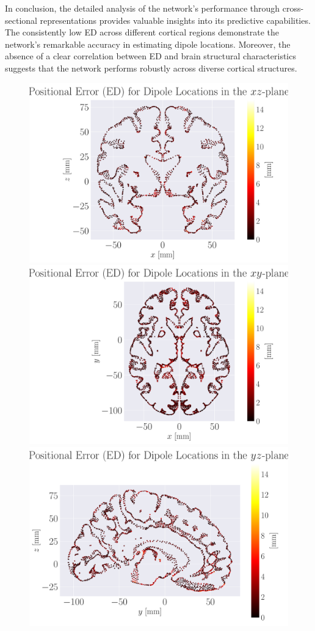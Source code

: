 \documentclass[a4paper, UKenglish, 11pt]{uiomaster}
\begin{document}
In conclusion, the detailed analysis of the network's performance through cross-sectional representations provides valuable insights into its predictive capabilities. The consistently low ED across different cortical regions demonstrate the network's remarkable accuracy in estimating dipole locations. Moreover, the absence of a clear correlation between ED and brain structural characteristics suggests that the network performs robustly across diverse cortical structures.


\begin{figure}[ht]
    \centering
    \includegraphics[width=0.7\linewidth]{figures/Simple/MED_simple_dipole_error_Euclidean Distance_0.pdf}
    \vspace{10pt} %
    \includegraphics[width=0.7\linewidth]{figures/Simple/MED_simple_dipole_error_Euclidean Distance_1.pdf}
    \vspace{10pt} %
    \includegraphics[width=0.7\linewidth]{figures/Simple/MED_simple_dipole_error_Euclidean Distance_2.pdf}

\end{figure}
\end{document}
